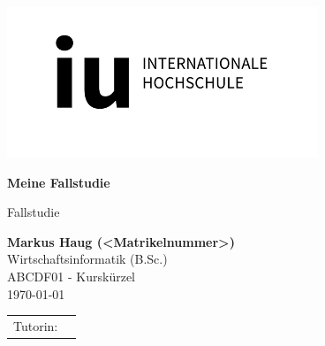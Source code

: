 \def\usesf{}
\let\usesf\sffamily %

\newsavebox{\Tutorin}


\setlength{\unitlength}{1pt}

\begin{titlepage}
\vspace{-39pt}\hspace*{300pt}\includegraphics[width=.21\paperwidth]{logos/IU.png}


\thispagestyle{empty}

\begin{center}
\hbox{}
\vfill
{\usesf}
{\huge\bfseries Meine Fallstudie \par}
\vskip 1.8cm
Fallstudie\\[2mm]
\vskip 1cm

{\large\bfseries Markus Haug (<Matrikelnummer>)\\}
\vskip 1.2cm
Wirtschaftsinformatik (B.Sc.)\\
ABCDF01 - Kurskürzel\\
\today %
\vskip 3cm
\begin{tabular}{p{3cm}l}
Tutorin: & \usebox{\Tutorin} \\
\end{tabular}
\vfill
\end{center}

\end{titlepage}


